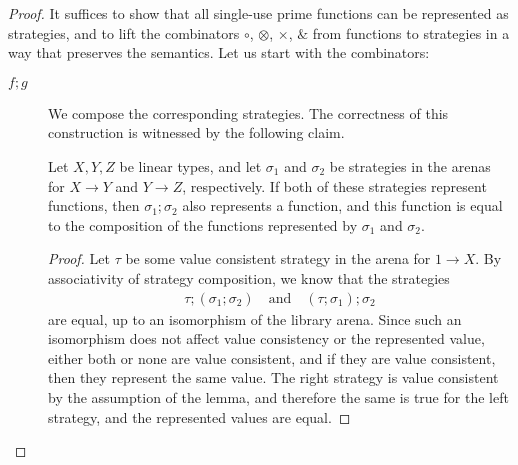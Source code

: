 \begin{proof}
    It suffices to show that all single-use prime functions can be represented as strategies,
    and  to lift the combinators $\circ$, $\otimes$, $\times$, $\&$ from functions to 
    strategies in a way that preserves the semantics. Let us start with the combinators:
    \begin{description}
        \item[$f; g$] We compose the corresponding strategies. The correctness of this construction is witnessed by the following claim. 
\begin{claim}\label{claim:composition-of-strategies-and-functions}    Let $X, Y, Z$ be linear types, and 
    let $\sigma_1$ and $\sigma_2$ be strategies in the arenas for $X \to Y$ and $Y \to Z$, respectively. If both of these strategies represent functions, then  $\sigma_1;\sigma_2$ also represents a function, and this function is equal to the composition of the functions represented by $\sigma_1$ and $\sigma_2$.
\end{claim}
\begin{proof}
    Let $\tau$ be some value consistent strategy in the arena for $1 \to X$. By associativity of strategy composition, we know that the strategies 
    \begin{align*}
    \tau;(\sigma_1;\sigma_2) \quad \text{and} \quad (\tau;\sigma_1);\sigma_2
    \end{align*}
    are equal, up to an isomorphism of the library arena. Since such an isomorphism does not affect value consistency or the represented value, either both or none are value consistent, and if they are value consistent, then they represent the same value. The right strategy is value consistent by the assumption of the lemma, and therefore the same is true for the left strategy, and the represented values are equal.
\end{proof}



\end{description}
\end{proof}
